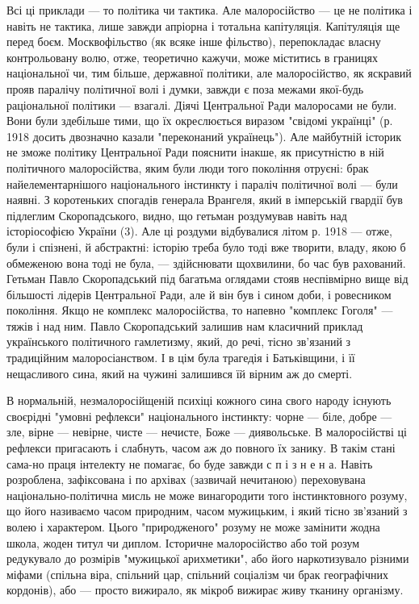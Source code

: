 Всі ці приклади — то політика чи тактика. Але малоросійство — це не політика і
навіть не тактика, лише завжди апріорна і тотальна капітуляція. Капітуляція ще
перед боєм. Москвофільство (як всяке інше фільство), перепокладає власну
контрольовану волю, отже, теоретично кажучи, може міститись в границях
національної чи, тим більше, державної політики, але малоросійство, як яскравий
прояв паралічу політичної волі і думки, завжди є поза межами якої-будь
раціональної політики — взагалі. Діячі Центральної Ради малоросами не були.
Вони були здебільше тими, що їх окреслюється виразом "свідомі українці" (р.
1918 досить двозначно казали "переконаний українець"). Але майбутній історик не
зможе політику Центральної Ради пояснити інакше, як присутністю в ній
політичного малоросійства, яким були люди того покоління отруєні: брак
найелементарнішого національного інстинкту і параліч політичної волі — були
наявні. З коротеньких спогадів генерала Врангеля, який в імперській гвардії був
підлеглим Скоропадського, видно, що гетьман роздумував навіть над історіософією
України (3). Але ці роздуми відбувалися літом р. 1918 — отже, були і спізнені,
й абстрактні: історію треба було тоді вже творити, владу, якою б обмеженою вона
тоді не була, — здійснювати щохвилини, бо час був рахований. Гетьман Павло
Скоропадський під багатьма оглядами стояв неспівмірно вище від більшості
лідерів Центральної Ради, але й він був і сином доби, і ровесником покоління.
Якщо не комплекс малоросійства, то напевно "комплекс Гоголя" — тяжів і над ним.
Павло Скоропадський залишив нам класичний приклад українського політичного
гамлетизму, який, до речі, тісно зв'язаний з традиційним малоросіанством. І в
цім була трагедія і Батьківщини, і її нещасливого сина, який на чужині
залишився їй вірним аж до смерті.

В нормальній, незмалоросійщеній психіці кожного сина свого народу існують
своєрідні "умовні рефлекси" національного інстинкту: чорне — біле, добре — зле,
вірне — невірне, чисте — нечисте, Боже — диявольське. В малоросійстві ці
рефлекси пригасають і слабнуть, часом аж до повного їх занику. В такім стані
сама-но праця інтелекту не помагає, бо буде завжди с п і з н е н а. Навіть
розроблена, зафіксована і по архівах (зазвичай нечитаною) переховувана
національно-політична мисль не може винагородити того інстинктовного розуму, що
його називаємо часом природним, часом мужицьким, і який тісно зв'язаний з волею
і характером. Цього "природженого" розуму не може замінити жодна школа, жоден
титул чи диплом. Історичне малоросійство або той розум редукувало до розмірів
"мужицької арихметики", або його наркотизувало різними міфами (спільна віра,
спільний цар, спільний соціалізм чи брак географічних кордонів), або — просто
вижирало, як мікроб вижирає живу тканину організму.

